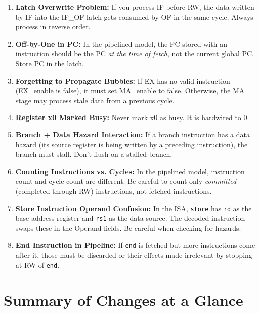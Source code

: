 \documentclass[12pt,a4paper]{article}
\begin{document}
\begin{enumerate}
    \item \textbf{Latch Overwrite Problem:} If you process IF before RW, the data written by IF into the IF\_OF latch gets consumed by OF in the same cycle. Always process in reverse order.

    \item \textbf{Off-by-One in PC:} In the pipelined model, the PC stored with an instruction should be the PC \textit{at the time of fetch}, not the current global PC. Store PC in the latch.

    \item \textbf{Forgetting to Propagate Bubbles:} If EX has no valid instruction (EX\_enable is false), it must set MA\_enable to false. Otherwise, the MA stage may process stale data from a previous cycle.

    \item \textbf{Register x0 Marked Busy:} Never mark x0 as busy. It is hardwired to 0.

    \item \textbf{Branch + Data Hazard Interaction:} If a branch instruction has a data hazard (its source register is being written by a preceding instruction), the branch must stall. Don't flush on a stalled branch.

    \item \textbf{Counting Instructions vs. Cycles:} In the pipelined model, instruction count and cycle count are different. Be careful to count only \textit{committed} (completed through RW) instructions, not fetched instructions.

    \item \textbf{Store Instruction Operand Confusion:} In the ISA, \texttt{store} has \texttt{rd} as the base address register and \texttt{rs1} as the data source. The decoded instruction swaps these in the Operand fields. Be careful when checking for hazards.

    \item \textbf{End Instruction in Pipeline:} If \texttt{end} is fetched but more instructions come after it, those must be discarded or their effects made irrelevant by stopping at RW of \texttt{end}.
\end{enumerate}

\section{Summary of Changes at a Glance}
\end{document}
